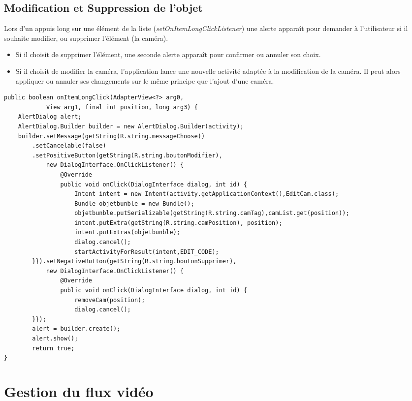 \subsection{Modification et Suppression de l'objet}
Lors d'un appuis long sur une élément de la liste
(\textit{setOnItemLongClickListener}) une alerte apparaît pour demander à
l'utilisateur si il souhaite modifier, ou supprimer l'élément (la caméra).
\begin{itemize}
  \item Si il choisit de supprimer l'élément, une seconde alerte apparaît pour confirmer
ou annuler son choix. 
\item Si il choisit de modifier la caméra, l'application lance une nouvelle
activité adaptée à la modification de la caméra. Il peut alors appliquer ou
annuler ses changements sur le même principe que l'ajout d'une caméra.
\end{itemize}
\newpage
\begin{changemargin}{0cm}{0cm}
\begin{lstlisting}[caption={Gestion d'un appui long sur un élément de la
liste.}]
public boolean onItemLongClick(AdapterView<?> arg0, 
			View arg1, final int position, long arg3) { 
	AlertDialog alert; 
	AlertDialog.Builder builder = new AlertDialog.Builder(activity);
	builder.setMessage(getString(R.string.messageChoose))
		.setCancelable(false)
		.setPositiveButton(getString(R.string.boutonModifier),
			new DialogInterface.OnClickListener() {
				@Override
				public void onClick(DialogInterface dialog, int id) {
					Intent intent = new Intent(activity.getApplicationContext(),EditCam.class); 
					Bundle objetbunble = new Bundle();
					objetbunble.putSerializable(getString(R.string.camTag),camList.get(position));
					intent.putExtra(getString(R.string.camPosition), position);
					intent.putExtras(objetbunble);
					dialog.cancel();
					startActivityForResult(intent,EDIT_CODE);
		}}).setNegativeButton(getString(R.string.boutonSupprimer),
			new DialogInterface.OnClickListener() {
				@Override
				public void onClick(DialogInterface dialog, int id) {
					removeCam(position);
					dialog.cancel();
		}});
		alert = builder.create();
		alert.show();
		return true;
}
\end{lstlisting}
\end{changemargin}




\section{Gestion du flux vidéo}
